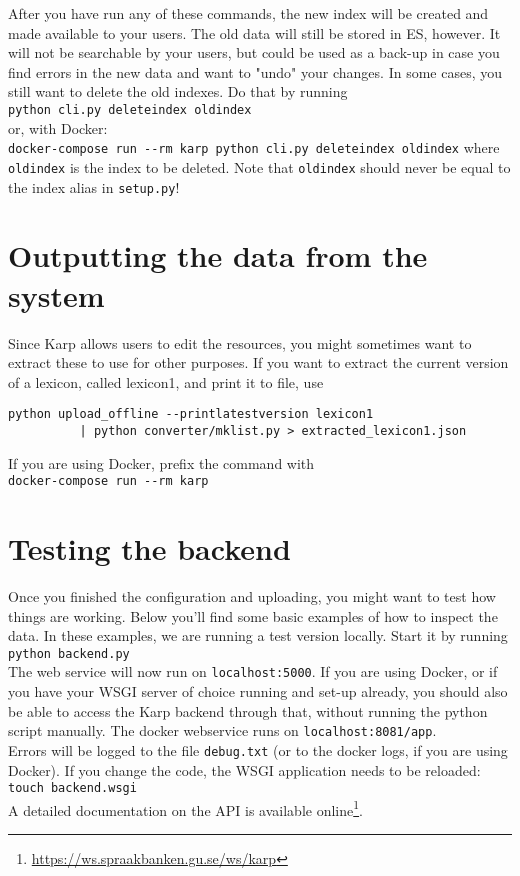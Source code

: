 \documentclass[
12pt, %
a4paper, %
oneside, %
headinclude,footinclude, %
BCOR0mm, %
]{scrartcl}
\begin{document}
After you have run any of these commands, the new index will be created and
made available to your users. The old data will still be stored in ES, however. It will not
be searchable by your users, but could be used as a back-up in case you find
errors in the new data and want to "undo" your changes. In some  cases, you
still want to delete the old indexes.
Do that by running\\
\verb|python cli.py deleteindex oldindex|\\
or, with Docker:\\
\verb|docker-compose run --rm karp python cli.py deleteindex oldindex|
where \verb|oldindex| is the index to be deleted. Note that \verb|oldindex|
should never be equal to the index alias in \verb|setup.py|!



\section{Outputting the data from the system}
\label{sec:output}
Since Karp allows users to edit the resources, you might sometimes want to extract
these to use for other purposes.
If you want to extract the current version of a lexicon, called lexicon1, and print it to
file, use
\begin{verbatim}
python upload_offline --printlatestversion lexicon1
          | python converter/mklist.py > extracted_lexicon1.json
\end{verbatim}
If you are using Docker, prefix the command with\\
\verb|docker-compose run --rm karp|

\section{Testing the backend}
Once you finished the configuration and uploading, you might want to
test how things are working. Below
you'll find some basic examples of how to inspect the data. In these examples,
we are running a test version locally. Start it by running \\
\verb|python backend.py|\\
The web service will now run on
\verb|localhost:5000|.
If you are using Docker, or if you have your WSGI server of choice running and
set-up already, you should
also be able to access the Karp backend through that, without running the python
script manually. The docker webservice runs on \verb|localhost:8081/app|.\\
Errors will be logged to the file \verb|debug.txt| (or to the docker logs, if
you are using Docker).
If you change the code, the WSGI application needs to be reloaded:\\
\verb|touch backend.wsgi|
\\A detailed documentation on the API is available online\footnote{%
\url{https://ws.spraakbanken.gu.se/ws/karp}}.\\
\end{document}

